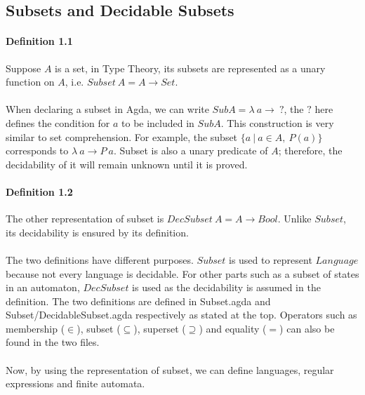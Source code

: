 \documentclass[twoside,openright,final]{bhamthesis}
\begin{document}
\subsection{Subsets and Decidable Subsets}

\paragraph{Definition 1.1} Suppose \(A\) is a set, in Type Theory, its
subsets are represented as a unary function on
\(A\), i.e. \(Subset\ A = A \to Set\). 

\paragraph{} When declaring a subset in Agda, we can write \(SubA =
\lambda\ a \to\ ?\), the \(?\) here defines the
condition for \(a\) to be included in \(SubA\). This construction is
very similar to set comprehension. For example, the subset 
\(\{a\ | \ a \in A,\ P(a)\}\) corresponds to \(\lambda\ a \to P\
a\). Subset is also a unary predicate of \(A\); therefore, the decidability of it will remain
unknown until it is proved. 

\paragraph{Definition 1.2} The other representation of subset is \(DecSubset\ A = A \to
Bool\). Unlike \(Subset\), its decidability is ensured by its
definition. 

\paragraph{} The two definitions have different purposes. \(Subset\) is used to represent \(Language\) because not every
language is decidable. For other parts 
such as a subset of states in an automaton, \(DecSubset\) is used
as the decidability is assumed in the definition. The two definitions
are defined in Subset.agda and Subset/DecidableSubset.agda
respectively as stated at the top. Operators such as membership (\(\in\)), subset
(\(\subseteq\)), superset (\(\supseteq\)) and equality (\(=\)) can
also be found in the two files. 

\paragraph{} Now, by using the representation of subset, we can define languages, regular expressions and finite
automata. 
\end{document}

